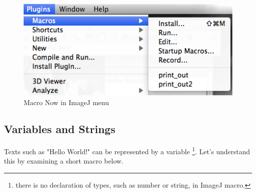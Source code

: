 \begin{indentexercise}
\begin{figure}[htbp]
\begin{center}
\includegraphics[scale=0.6]{fig/firstMacroSetInMenu.png}
\caption{Macro Now in ImageJ menu} \label{fig_MacroInMenu}
\end{center}
\end{figure}
\end{indentexercise}

\subsection{Variables and Strings}
Texts such as "Hello World!" can be represented by a variable 
\footnote{there is no declaration of types, such as number or string, in ImageJ macro.}.
Let's understand this by examining a short macro below.